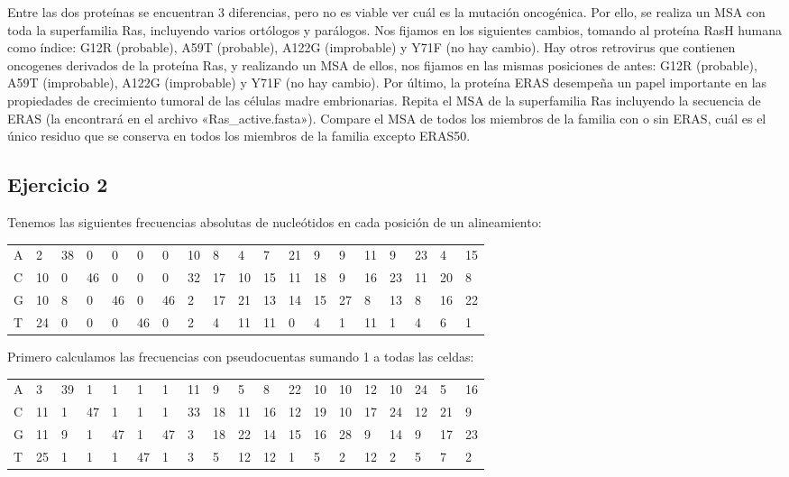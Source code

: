 Entre las dos proteínas se encuentran 3 diferencias, pero no es viable ver cuál es la mutación oncogénica. Por ello, se realiza un MSA con toda la superfamilia Ras, incluyendo varios ortólogos y parálogos. Nos fijamos en los siguientes cambios, tomando al proteína RasH humana como índice: G12R (probable), A59T (probable), A122G (improbable) y Y71F (no hay cambio). Hay otros retrovirus que contienen oncogenes derivados de la proteína Ras, y realizando un MSA de ellos, nos fijamos en las mismas posiciones de antes: G12R (probable), A59T (improbable), A122G (improbable) y Y71F (no hay cambio). Por último, la proteína ERAS desempeña un papel importante en las propiedades de crecimiento tumoral de las células madre embrionarias. Repita el MSA de la superfamilia Ras incluyendo la secuencia de ERAS (la encontrará en el archivo «Ras\_active.fasta»). Compare el MSA de todos los miembros de la familia con o sin ERAS, cuál es el único residuo que se conserva en todos los miembros de la familia excepto ERAS50.

\subsection{Ejercicio 2}
Tenemos las siguientes frecuencias absolutas de nucleótidos en cada posición de un alineamiento:
\begin{table}[htbp]
\begin{tabular}{l | llllllllllllllllll}
A & 2  & 38 & 0  & 0  & 0  & 0  & 10 & 8  & 4  & 7  & 21 & 9  & 9  & 11 & 9  & 23 & 4  & 15 \\
C & 10 & 0  & 46 & 0  & 0  & 0  & 32 & 17 & 10 & 15 & 11 & 18 & 9  & 16 & 23 & 11 & 20 & 8  \\
G & 10 & 8  & 0  & 46 & 0  & 46 & 2  & 17 & 21 & 13 & 14 & 15 & 27 & 8  & 13 & 8  & 16 & 22 \\
T & 24 & 0  & 0  & 0  & 46 & 0  & 2  & 4  & 11 & 11 & 0  & 4  & 1  & 11 & 1  & 4  & 6  & 1 
\end{tabular}
\end{table}

Primero calculamos las frecuencias con pseudocuentas sumando 1 a todas las celdas:
\begin{table}[htbp]
\begin{tabular}{l | llllllllllllllllll}
A & 3  & 39 & 1  & 1  & 1  & 1  & 11 & 9  & 5  & 8  & 22 & 10 & 10 & 12 & 10 & 24 & 5  & 16 \\
C & 11 & 1  & 47 & 1  & 1  & 1  & 33 & 18 & 11 & 16 & 12 & 19 & 10 & 17 & 24 & 12 & 21 & 9  \\
G & 11 & 9  & 1  & 47 & 1  & 47 & 3  & 18 & 22 & 14 & 15 & 16 & 28 & 9  & 14 & 9  & 17 & 23 \\
T & 25 & 1  & 1  & 1  & 47 & 1  & 3  & 5  & 12 & 12 & 1  & 5  & 2  & 12 & 2  & 5  & 7  & 2 
\end{tabular}
\end{table} 

